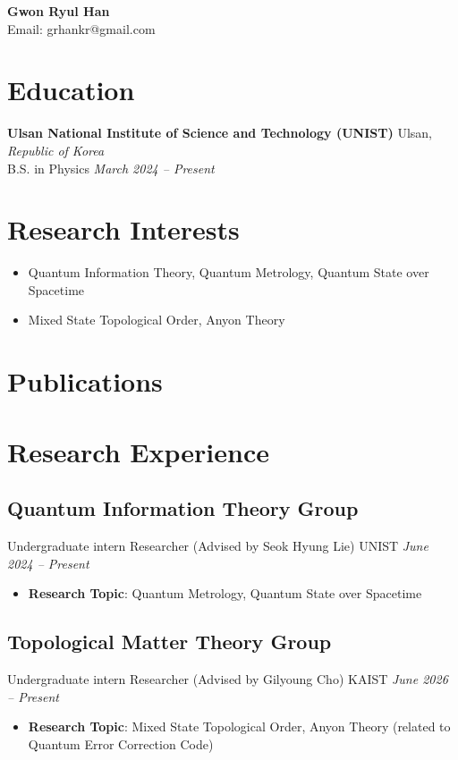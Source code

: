 \documentclass[11pt,a4paper]{article}
\begin{document}
\begin{center}
    {\Huge \textbf{Gwon Ryul Han}} \\[6pt]
    Email: grhankr@gmail.com
\end{center}

\section*{Education}
\textbf{Ulsan National Institute of Science and Technology (UNIST)} \hfill Ulsan, \textit{Republic of Korea} \\
B.S. in Physics \hfill \textit{March 2024 -- Present}

\section*{Research Interests}

\begin{itemize}
    \item Quantum Information Theory, Quantum Metrology, Quantum State over Spacetime
    \item Mixed State Topological Order, Anyon Theory
\end{itemize}

\section*{Publications}
\nocite{*}
\printbibliography[heading=none]

\section*{Research Experience}

\subsection*{Quantum Information Theory Group}
Undergraduate intern Researcher (Advised by Seok Hyung Lie) \hfill UNIST \textit{June 2024 -- Present}
\begin{itemize}
    \item \textbf{Research Topic}: Quantum Metrology, Quantum State over Spacetime 
\end{itemize}

\subsection*{Topological Matter Theory Group}
Undergraduate intern Researcher (Advised by Gilyoung Cho) \hfill KAIST \textit{June 2026 -- Present}
\begin{itemize}
    \item \textbf{Research Topic}: Mixed State Topological Order, Anyon Theory (related to Quantum Error Correction Code)
\end{itemize}
\end{document}
